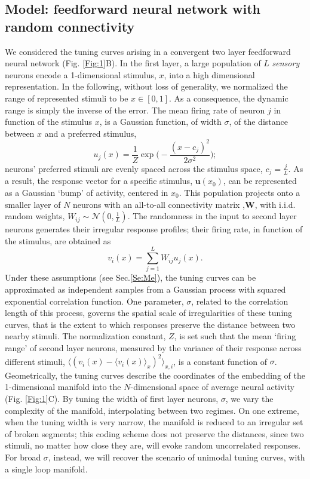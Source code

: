 \documentclass[a4paper]{article}
\begin{document}
\subsection{Model: feedforward neural network with random connectivity}
We considered the tuning curves arising in a convergent two layer feedforward neural network (Fig.  \ref{Fig:1}B). In the first layer,  a large population of $L$ \emph{sensory} neurons encode a 1-dimensional stimulus, $x$, into a high dimensional representation. 
In the following, without loss of generality, we normalized the range of represented stimuli to be $x \in [0,1]$. As a consequence, the dynamic range is simply the inverse of the error.  The mean firing rate of neuron $j$ in function of the stimulus $x$, is a Gaussian function, of width $\sigma$, of the distance between $x$  and a preferred stimulus,
\begin{equation} 
u_j(x) = \frac{1}{Z} \exp\Big(-\frac{(x-c_j)^2}{2\sigma^2}\Big);
\end{equation}neurons' preferred stimuli are evenly spaced across the stimulus space, $c_j = \frac{j}{L}$.  As a result, the response vector for a specific stimulus, $\mathbf{u}(x_0)$, can be represented as a Gaussian `bump' of activity, centered in $x_0$.  This population projects onto a smaller layer of $N$ neurons with an all-to-all connectivity matrix ,$\mathbf{W}$, with i.i.d. random weights, $W_{ij} \sim \mathcal{N}(0,\frac{1}{L})$.  The randomness in the input to second layer neurons generates their irregular response profiles;  their firing rate, in function of the stimulus, are obtained as
\begin{equation}
v_i(x) = \sum_{j=1}^L W_{ij}u_j(x).
\end{equation}
Under these assumptions (see Sec.\ref{Se:Me}), the tuning curves can be approximated as independent samples from a Gaussian process with squared exponential correlation function. One parameter, $\sigma$, related to the correlation length of this process, governs the spatial scale of irregularities of these tuning curves, that is the extent to which responses preserve the distance between two nearby stimuli. The normalization constant, $Z$, is set such that the mean `firing range' of second layer neurons, measured by the variance of their response across different stimuli, $\Big \langle(v_i(x) - \langle v_i(x) \rangle_x)^2 \Big\rangle_{x,i}$, is a constant function of $\sigma$. Geometrically, the tuning curves describe the coordinates of the embedding of the 1-dimensional manifold into the $N$-dimensional space of average neural activity (Fig. \ref{Fig:1}C). By tuning the width of first layer neurons, $\sigma$, we vary the complexity of the manifold, interpolating between two regimes. On one extreme, when the tuning width is very narrow, the manifold is reduced to an irregular set of broken segments; this coding scheme does not preserve the distances, since two stimuli, no matter how close they are, will evoke random uncorrelated responses. For broad $\sigma$, instead,  we will recover the scenario of unimodal tuning curves, with a single loop manifold.
\end{document}
